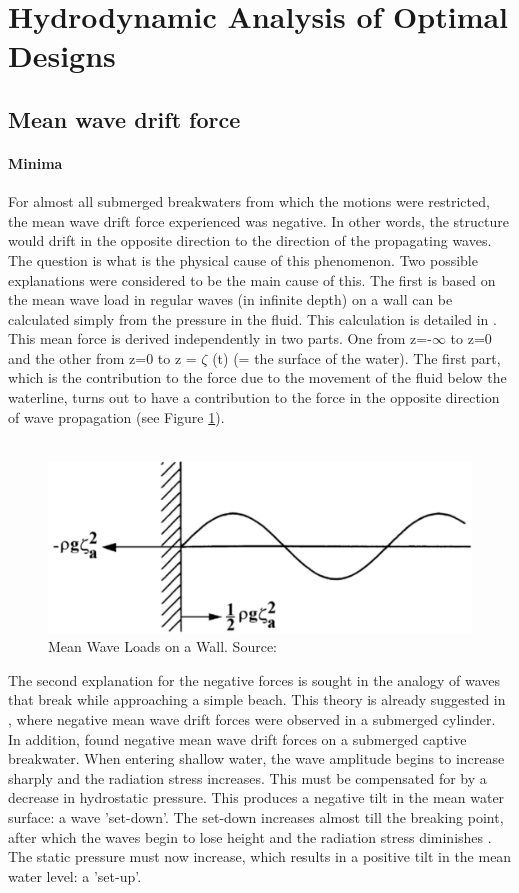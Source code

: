 \section{Hydrodynamic Analysis of Optimal Designs}
\label{sec: discussion hydrodynamical optimisation}

\subsection{Mean wave drift force}

\paragraph{Minima}
For almost all submerged breakwaters from which the motions were restricted, the mean wave drift force experienced was negative. In other words, the structure would drift in the opposite direction to the direction of the propagating waves. The question is what is the physical cause of this phenomenon. Two possible explanations were considered to be the main cause of this. The first is based on the mean wave load in regular waves (in infinite depth) on a wall can be calculated simply from the pressure in the fluid. This calculation is detailed in \citet{journee2000offshore}. This mean force is derived independently in two parts. One from z=-$\infty$ to z=0 and the other from z=0 to z = $\zeta$ (t) (= the surface of the water). The first part, which is the contribution to the force due to the movement of the fluid below the waterline, turns out to have a contribution to the force in the opposite direction of wave propagation (see Figure \ref{fig: force on a wall journee}). \\
\\
\begin{figure}[h]
    \centering
    \includegraphics[width=0.3\linewidth]{figures/Theory/journee.PNG}
    \caption{Mean Wave Loads on a Wall. Source: \citep{journee2000offshore}}
    \label{fig: force on a wall journee}
\end{figure}

The second explanation for the negative forces is sought in the analogy of waves that break while approaching a simple beach. This theory is already suggested in \citet{longuethiggins1977}, where negative mean wave drift forces were observed in a submerged cylinder. In addition, \citet{Zanden2021} found negative mean wave drift forces on a submerged captive breakwater. When entering shallow water, the wave amplitude begins to increase sharply and the radiation stress increases. This must be compensated for by a decrease in hydrostatic pressure. This produces a negative tilt in the mean water surface: a wave 'set-down'. The set-down increases almost till the breaking point, after which the waves begin to lose height and the radiation stress diminishes \citep{longuethiggins1964}. The static pressure must now increase, which results in a positive tilt in the mean water level: a 'set-up'. \\
\\

